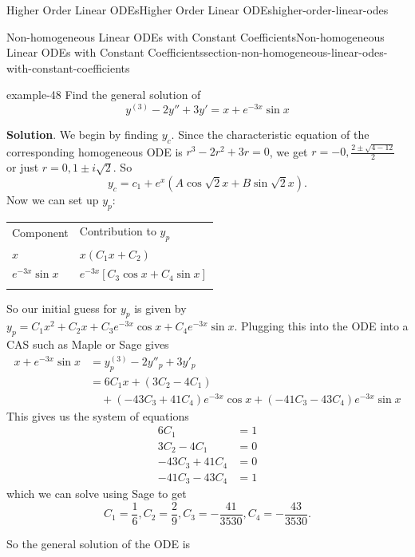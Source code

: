 \documentclass[oneside,10pt,]{book}
\numberwithin{equation}{section}
\newcommand{\hrulethick} {\noalign{\hrule height 0.11em}}
\newcommand{\brackets}[1]{\left[ #1 \right]}
\newcommand{\parens}[1]{\left( #1 \right)}
\newcommand{\amp}{&}
\begin{document}
\begin{chapterptx}{Higher Order Linear ODEs}{}{Higher Order Linear ODEs}{}{}{higher-order-linear-odes}
\begin{sectionptx}{Non-homogeneous Linear ODEs with Constant Coefficients}{}{Non-homogeneous Linear ODEs with Constant Coefficients}{}{}{section-non-homogeneous-linear-odes-with-constant-coefficients}
\begin{table}
\end{table}
\begin{example}{}{example-48}%
\hypertarget{p-293}{}%
Find the general solution of%
\begin{equation*}
y^{(3)}-2y''+3y'= x+e^{-3x}\sin x
\end{equation*}
%
\par\smallskip%
\noindent\textbf{Solution}.\hypertarget{solution-45}{}\quad%
\hypertarget{p-294}{}%
We begin by finding \(y_{c}\). Since the characteristic equation of the corresponding homogeneous ODE is \(r^{3}-2r^{2}+3r=0\), we get \(r=-0,\frac{2\pm\sqrt{4-12}}{2}\) or just \(r=0,1\pm i\sqrt{2}\). So%
\begin{equation*}
y_{c} = c_{1}+e^{x}(A\cos\sqrt{2}x+B\sin\sqrt{2}x).
\end{equation*}
Now we can set up \(y_{p}\):%
\begin{table}
\centering
\begin{tabular}{ll}\hrulethick
Component&Contribution to \(y_{p}\)\tabularnewline\hrulethick
\(x\)&\(x(C_{1}x+C_{2})\)\tabularnewline[0pt]
\(e^{-3x}\sin x\)&\(e^{-3x}\brackets{C_{3}\cos x+C_{4}\sin x}\)\tabularnewline\hrulethick
\end{tabular}
\end{table}
\hypertarget{p-295}{}%
So our initial guess for \(y_{p}\) is given by \(y_{p} = C_{1}x^{2}+C_{2}x+C_{3}e^{-3x}\cos x+C_{4}e^{-3x}\sin x\). Plugging this into the ODE into a CAS such as Maple or Sage gives%
\begin{align*}
x+e^{-3x}\sin x \amp= y^{(3)}_{p}-2y''_{p}+3y'_{p}\\
\amp= 6C_{1}x+(3C_{2}-4C_{1}) \\
\amp\quad + \parens{-43C_{3}+41C_{4}}e^{-3x}\cos x+\parens{-41C_{3}-43C_{4}}e^{-3x}\sin x
\end{align*}
This gives us the system of equations%
\begin{align*}
6C_{1}  \amp=  1\\
3C_{2}-4C_{1} \amp=  0\\
-43C_{3}+41C_{4}  \amp=  0\\
-41C_{3}-43C_{4}  \amp= 1
\end{align*}
which we can solve using Sage to get%
\begin{equation*}
C_{1} = \frac{1}{6},C_{2} = \frac{2}{9},C_{3} = -\frac{41}{3530},C_{4}=-\frac{43}{3530}.
\end{equation*}
%
\par
\hypertarget{p-296}{}%
So the general solution of the ODE is%
\begin{equation*}

\end{equation*}
\end{example}
\end{sectionptx}
\end{chapterptx}
\end{document}
